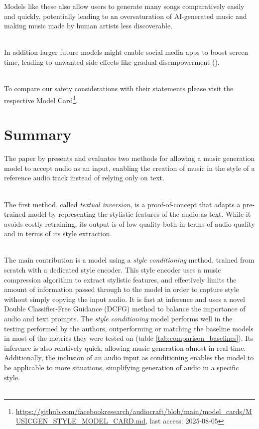 \documentclass[a4paper,12pt,twoside]{article}
\begin{document}
Models like these also allow users to generate many songs comparatively easily and quickly, potentially leading to an oversaturation of AI-generated music and making music made by human artists less discoverable. \\ \

In addition larger future models might enable social media apps to boost screen time, leading to unwanted side effects like gradual disempowerment (\cite{kulveitGradualDisempowermentSystemic2024}).\\ \

To compare our safety considerations with their statements please visit the respective Model Card\footnote{\url{https://github.com/facebookresearch/audiocraft/blob/main/model_cards/MUSICGEN_STYLE_MODEL_CARD.md}, last access: 2025-08-05}.


\section{Summary}\label{sec:summary}

The paper by \cite{rouardAudioConditioningMusic2024} presents and evaluates two methods for allowing a music generation model to accept audio as an input, enabling the creation of music in the style of a reference audio track instead of relying only on text. \\ \

The first method, called \textit{textual inversion}, is a proof-of-concept that adapts a pre-trained model by representing the stylistic features of the audio as text. While it avoids costly retraining, its output is of low quality both in terms of audio quality and in terms of its style extraction. \\ \

The main contribution is a model using a \textit{style conditioning} method, trained from scratch with a dedicated style encoder. This style encoder uses a music compression algorithm to extract stylistic features, and effectively limits the amount of information passed through to the model in order to capture style without simply copying the input audio. It is fast at inference and uses a novel Double Classifier-Free Guidance (DCFG) method to balance the importance of audio and text prompts. The \textit{style conditioning} model performs well in the testing performed by the authors, outperforming or matching the baseline models in most of the metrics they were tested on (table \ref{tab:comparison_baselines}). Its inference is also relatively quick, allowing music generation almost in real-time. Additionally, the inclusion of an audio input as conditioning enables the model to be applicable to more situations, simplifying generation of audio in a specific style. \\ \
\end{document}

